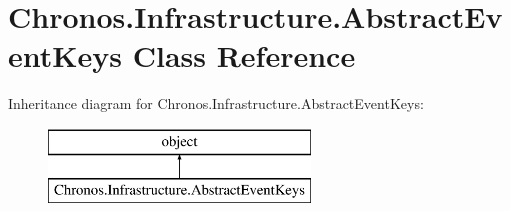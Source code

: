 \hypertarget{classChronos_1_1Infrastructure_1_1AbstractEventKeys}{}\section{Chronos.\+Infrastructure.\+Abstract\+Event\+Keys Class Reference}
\label{classChronos_1_1Infrastructure_1_1AbstractEventKeys}
Inheritance diagram for Chronos.\+Infrastructure.\+Abstract\+Event\+Keys\+:\begin{figure}[H]
\begin{center}
\leavevmode
\includegraphics[height=2.000000cm]{classChronos_1_1Infrastructure_1_1AbstractEventKeys}
\end{center}
\end{figure}
